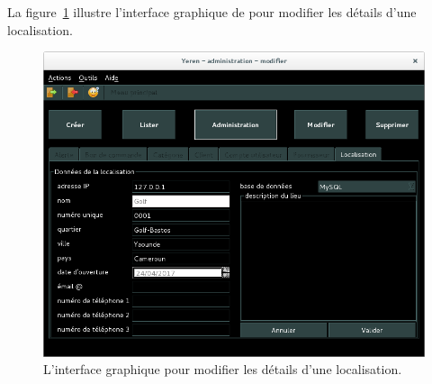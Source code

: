
\newpage
{}

La figure~\ref{fig:admin-localisations-modifier} illustre
l'interface graphique de \yeren pour modifier les d\'etails
d'une localisation.\\

\begin{figure}[!htpb]
	\centering
	\includegraphics[scale=0.45]{images/localisation-modifier.png}
	\caption{L'interface graphique pour modifier les d\'etails
			d'une localisation.}
	\label{fig:admin-localisations-modifier}
\end{figure}

